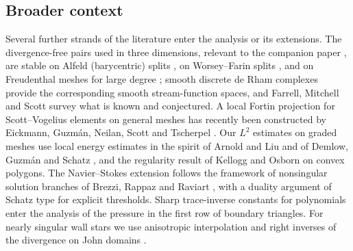 \documentclass[pdflatex,sn-mathphys-num]{sn-jnl}
\theoremstyle{thmstyleone}
\theoremstyle{thmstylethree}
\begin{document}
\subsection{Broader context}
Several further strands of the literature enter the analysis or its extensions. The divergence-free pairs used in three dimensions, relevant to the companion paper \cite{PadhiThreeD}, are stable on Alfeld (barycentric) splits \cite{Zhang2005,GuzmanNeilan2018}, on Worsey--Farin splits \cite{GuzmanLischkeNeilan2022}, and on Freudenthal meshes for large degree \cite{Zhang2011}; smooth discrete de Rham complexes \cite{Neilan2015,FuGuzmanNeilan2020} provide the corresponding smooth stream-function spaces, and Farrell, Mitchell and Scott \cite{FarrellMitchellScott2024} survey what is known and conjectured. A local Fortin projection for Scott--Vogelius elements on general meshes has recently been constructed by Eickmann, Guzm\'an, Neilan, Scott and Tscherpel \cite{EickmannGNST2026}. Our $L^2$ estimates on graded meshes use local energy estimates in the spirit of Arnold and Liu \cite{ArnoldLiu1995} and of Demlow, Guzm\'an and Schatz \cite{DemlowGuzmanSchatz2011}, and the regularity result of Kellogg and Osborn \cite{KelloggOsborn1976} on convex polygons. The Navier--Stokes extension follows the framework of nonsingular solution branches of Brezzi, Rappaz and Raviart \cite{BRR1980,GiraultRaviart}, with a duality argument of Schatz type \cite{Schatz1974} for explicit thresholds. Sharp trace-inverse constants for polynomials \cite{WarburtonHesthaven2003} enter the analysis of the pressure in the first row of boundary triangles. For nearly singular wall stars we use anisotropic interpolation \cite{BabuskaAziz1976,Apel1999} and right inverses of the divergence on John domains \cite{AcostaDuranMuschietti2006}.
\end{document}
